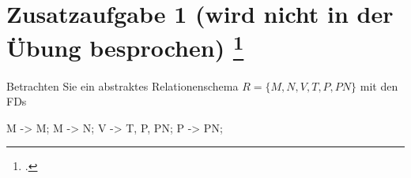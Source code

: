 \documentclass{lehramt-informatik-aufgabe}
\begin{document}
\let\a=\liAttributHuelleOhneMathe
\let\m=\liMengeOhneMathe
\let\fa=\liFunktionaleAbhaengigkeit


\section{Zusatzaufgabe 1 (wird nicht in der Übung
besprochen)
\footcite{db:pdf:tum:uebung-08}}

Betrachten Sie ein abstraktes Relationenschema $R = \{M, N, V, T, P,
PN\}$ mit den FDs

\begin{liFunktionaleAbhaengigkeiten}
M -> M;
M -> N;
V -> T, P, PN;
P -> PN;
\end{liFunktionaleAbhaengigkeiten}
\end{document}
